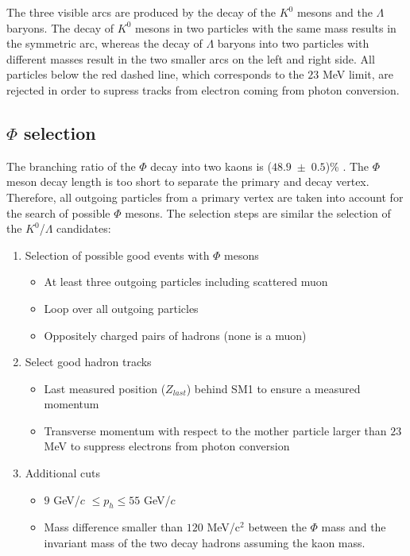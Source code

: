 The three visible arcs are produced by the decay of the $K^0$ mesons and the $\Lambda$ baryons. The decay of $K^0$ mesons in two particles with the same mass results in the symmetric arc, whereas the decay of $\Lambda$ baryons into two particles with different masses result in the two smaller arcs on the left and right side. All particles below the red dashed line, which corresponds to the $23$ MeV limit, are rejected in order to supress tracks from electron coming from photon conversion.

\subsection{$\Phi$ selection}

The branching ratio of the $\Phi$ decay into two kaons is ($48.9$~$\pm$~$0.5$)\% \cite{PDG}. The $\Phi$ meson decay length is too short to separate the primary and decay vertex. Therefore, all outgoing particles from a primary vertex are taken into account for the search of possible $\Phi$ mesons. The selection steps are similar the selection of the $K^0$/$\Lambda$ candidates:

\begin{enumerate}
  \item Selection of possible good events with $\Phi$ mesons
  \begin{itemize}
    \item At least three outgoing particles including scattered muon
    \item Loop over all outgoing particles
    \item Oppositely charged pairs of hadrons (none is a muon)
  \end{itemize}
  \item Select good hadron tracks
  \begin{itemize}
    \item Last measured position ($Z_{last}$) behind SM1 to ensure a measured momentum
    \item Transverse momentum with respect to the mother particle larger than $23$ MeV to suppress electrons from photon conversion
  \end{itemize}
  \item Additional cuts
  \begin{itemize}
    \item $9$ GeV/$c$ $\leq p_h \leq 55$ GeV/$c$
    \item Mass difference smaller than $120$ MeV/c$^2$ between the $\Phi$ mass and the invariant mass of the two decay hadrons assuming the kaon mass.
  \end{itemize}
\end{enumerate}

